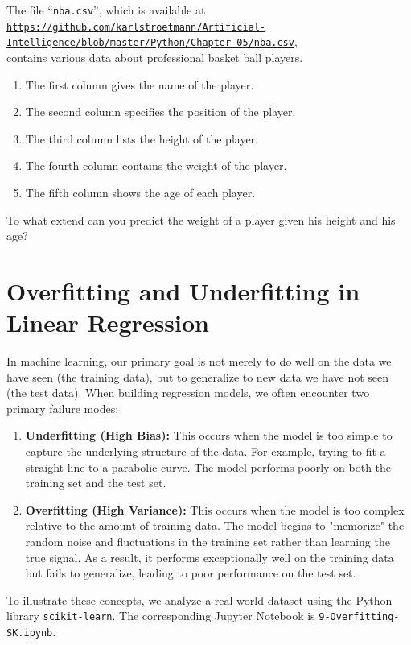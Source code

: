 \exercise
The file ``\texttt{nba.csv}'', which is available at
\\[0.2cm]
\hspace*{0.3cm}
\href{https://github.com/karlstroetmann/Artificial-Intelligence/blob/master/Python/Chapter-05/nba.csv}{\texttt{https://github.com/karlstroetmann/Artificial-Intelligence/blob/master/Python/Chapter-05/nba.csv}},
\\[0.2cm]
contains various data about professional basket ball players.
\begin{enumerate}
\item The first column gives the name of the player.
\item The second column specifies the position of the player.
\item The third column lists the height of the player.
\item The fourth column contains the weight of the player.
\item The fifth column shows the age of each player.
\end{enumerate}
To what extend can you predict the weight of a player given his height and his age?
\eox

\section{Overfitting and Underfitting in Linear Regression}

In machine learning, our primary goal is not merely to do well on the data we have seen (the training data),
but to generalize to new data we have not seen (the test data). When building regression models, we often
encounter two primary failure modes: 
\begin{enumerate}
\item \textbf{Underfitting (High Bias):} This occurs when the model is too simple to capture the underlying
      structure of the data. For example, trying to fit a straight line to a parabolic curve. The model
      performs poorly on both the training set and the test set. 
\item \textbf{Overfitting (High Variance):} This occurs when the model is too complex relative to the
      amount of training data. The model begins to "memorize" the random noise and fluctuations in the training
      set rather than learning the true signal. As a result, it performs exceptionally well on the training
      data but fails to generalize, leading to poor performance on the test set. 
\end{enumerate}
To illustrate these concepts, we analyze a real-world dataset using the Python library
\texttt{scikit-learn}. The corresponding Jupyter Notebook is \texttt{9-Overfitting-SK.ipynb}. 

